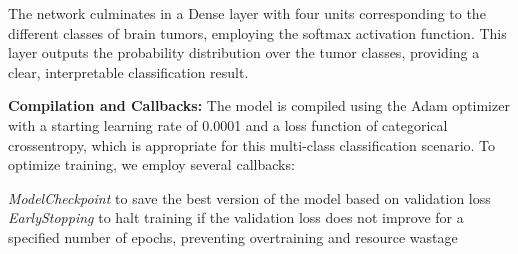 The network culminates in a Dense layer with four units corresponding to the different classes of brain tumors, employing the softmax activation function. This layer outputs the probability distribution over the tumor classes, providing a clear, interpretable classification result.

\textbf{Compilation and Callbacks:} The model is compiled using the Adam optimizer with a starting learning rate of 0.0001 and a loss function of categorical crossentropy, which is appropriate for this multi-class classification scenario. To optimize training, we employ several callbacks:

    \textit{ModelCheckpoint} to save the best version of the model based on validation loss
    \textit{EarlyStopping} to halt training if the validation loss does not improve for a specified number of epochs, preventing overtraining and resource wastage

